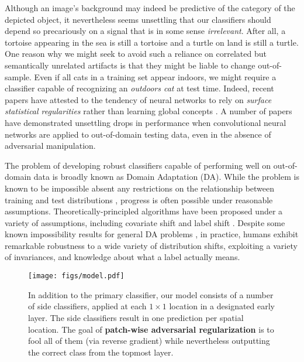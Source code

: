 \documentclass{article}
\begin{document}
Although an image's background may indeed be predictive
of the category of the depicted object,
it nevertheless seems unsettling that our classifiers
should depend so precariously on a signal 
that is in some sense \emph{irrelevant}.
After all, a tortoise appearing in the sea is still a tortoise
and a turtle on land is still a turtle. 
One reason why we might seek to avoid such a reliance 
on correlated but semantically unrelated artifacts 
is that they might be liable to change out-of-sample.
Even if all cats in a training set appear indoors,
we might require a classifier 
capable of recognizing an \emph{outdoors cat} at test time.
Indeed, recent papers have attested to the tendency 
of neural networks to rely on \emph{surface statistical regularities}
rather than learning global concepts \citep{jo2017measuring, geirhos2018imagenettrained}.
A number of papers have demonstrated unsettling drops in performance
when convolutional neural networks are applied to out-of-domain testing data,
even in the absence of adversarial manipulation.


The problem of developing robust classifiers 
capable of performing well on out-of-domain data 
is broadly known as Domain Adaptation (DA).
While the problem is known to be impossible 
absent any restrictions on the relationship 
between training and test distributions \citep{ben2010impossibility},
progress is often possible under reasonable assumptions.
Theoretically-principled algorithms have been proposed
under a variety of assumptions, including covariate shift 
\citep{shimodaira2000improving, gretton2009covariate}
and label shift 
\citep{storkey2009training, scholkopf2012causal, zhang2013domain, lipton2018detecting}. 
Despite some known impossibility results 
for general DA problems \citep{ben2010impossibility}, 
in practice, humans exhibit remarkable robustness 
to a wide variety of distribution shifts,
exploiting a variety of invariances,
and knowledge about what a label actually means.

\begin{figure}
    \centering
    \texttt{[image: figs/model.pdf]}
    \caption{
In addition to the primary classifier, our model consists of a number of side classifiers, applied at each $1\times1$ location in a designated early layer. 
    The side classifiers result in one prediction per spatial location. 
    The goal of \textbf{patch-wise adversarial regularization} 
    is to fool all of them (via reverse gradient) 
    while nevertheless outputting the correct class from the topmost layer.}
    \label{fig:model}
\end{figure}
\end{document}
